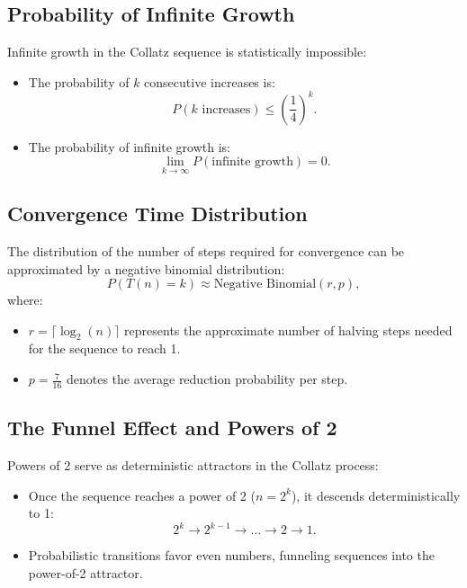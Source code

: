\subsection{Probability of Infinite Growth}
Infinite growth in the Collatz sequence is statistically impossible:
\begin{itemize}
    \item The probability of \( k \) consecutive increases is:
    \[
    P(k \text{ increases}) \leq \left(\frac{1}{4}\right)^k.
    \]
    \item The probability of infinite growth is:
    \[
    \lim_{k \to \infty} P(\text{infinite growth}) = 0.
    \]
\end{itemize}

\subsection{Convergence Time Distribution}
The distribution of the number of steps required for convergence can be approximated by a negative binomial distribution:
\[
P(T(n) = k) \approx \text{Negative Binomial}(r, p),
\]
where:
\begin{itemize}
    \item \( r = \lceil \log_2(n) \rceil \) represents the approximate number of halving steps needed for the sequence to reach 1.
    \item \( p = \frac{7}{16} \) denotes the average reduction probability per step.
\end{itemize}

\subsection{The Funnel Effect and Powers of 2}
Powers of 2 serve as deterministic attractors in the Collatz process:
\begin{itemize}
    \item Once the sequence reaches a power of 2 (\( n = 2^k \)), it descends deterministically to 1:
    \[
    2^k \to 2^{k-1} \to \dots \to 2 \to 1.
    \]
    \item Probabilistic transitions favor even numbers, funneling sequences into the power-of-2 attractor.
\end{itemize}

